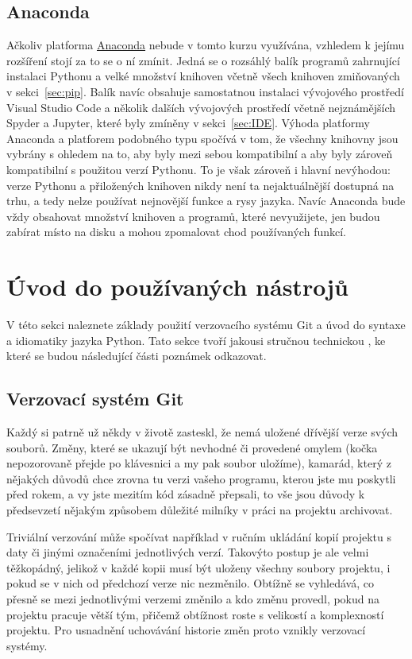 \documentclass[a4paper,11pt,twoside]{article}
\theoremstyle{red}
\theoremstyle{green}
\begin{document}
\subsection{Anaconda}
    Ačkoliv platforma \href{https://www.anaconda.com/}{Anaconda} nebude v tomto kurzu využívána, vzhledem k jejímu rozšíření stojí za to se o ní zmínit.
    Jedná se o rozsáhlý balík programů zahrnující instalaci Pythonu a velké množství knihoven včetně všech knihoven zmiňovaných v sekci~\ref{sec:pip}.
    Balík navíc obsahuje samostatnou instalaci vývojového prostředí Visual Studio Code a několik dalších vývojových prostředí včetně nejznámějších Spyder a Jupyter, které byly zmíněny v sekci~\ref{sec:IDE}.
    Výhoda platformy Anaconda a platforem podobného typu spočívá v tom, že všechny knihovny jsou vybrány s ohledem na to, aby byly mezi sebou kompatibilní a aby byly zároveň kompatibilní s použitou verzí Pythonu.
    To je však zároveň i hlavní nevýhodou: verze Pythonu a přiložených knihoven nikdy není ta nejaktuálnější dostupná na trhu, a tedy nelze používat nejnovější funkce a rysy jazyka.
    Navíc Anaconda bude vždy obsahovat množství knihoven a programů, které nevyužijete, jen budou zabírat místo na disku a mohou zpomalovat chod používaných funkcí.

\section{Úvod do používaných nástrojů}
    V této sekci naleznete základy použití verzovacího systému Git a úvod do syntaxe a idiomatiky jazyka Python.
    Tato sekce tvoří jakousi stručnou technickou , ke které se budou následující části poznámek odkazovat.

\subsection{Verzovací systém Git}
    Každý si patrně už někdy v životě zasteskl, že nemá uložené dřívější verze svých souborů.
    Změny, které se ukazují být nevhodné či provedené omylem (kočka nepozorovaně přejde po klávesnici a my pak soubor uložíme), kamarád, který z nějakých důvodů chce zrovna tu verzi vašeho programu, kterou jste mu poskytli před rokem, a vy jste mezitím kód zásadně přepsali, to vše jsou důvody k předsevzetí nějakým způsobem důležité milníky v práci na projektu archivovat.

    Triviální verzování může spočívat například v ručním ukládání kopií projektu s daty či jinými označeními jednotlivých verzí.
    Takovýto postup je ale velmi těžkopádný, jelikož v každé kopii musí být uloženy všechny soubory projektu, i pokud se v nich od předchozí verze nic nezměnilo.
    Obtížně se vyhledává, co přesně se mezi jednotlivými verzemi změnilo a kdo změnu provedl, pokud na projektu pracuje větší tým, přičemž obtížnost roste s velikostí a komplexností projektu.
    Pro usnadnění uchovávání historie změn proto vznikly verzovací systémy.    
\end{document}
